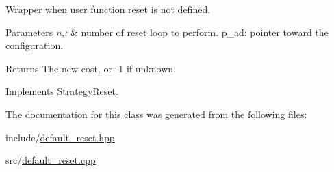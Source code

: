 \-Wrapper when user function reset is not defined. 


\begin{DoxyParams}{\-Parameters}
{\em n,\-:} & number of reset loop to perform. p\-\_\-ad\-: pointer toward the configuration. \\
\hline
\end{DoxyParams}
\begin{DoxyReturn}{\-Returns}
\-The new cost, or -\/1 if unknown. 
\end{DoxyReturn}


\-Implements \hyperlink{classStrategyReset_af6cedf730c45825c61390455bd6f90a4}{\-Strategy\-Reset}.



\-The documentation for this class was generated from the following files\-:\begin{DoxyCompactItemize}
\item 
include/\hyperlink{default__reset_8hpp}{default\-\_\-reset.\-hpp}\item 
src/\hyperlink{default__reset_8cpp}{default\-\_\-reset.\-cpp}\end{DoxyCompactItemize}
